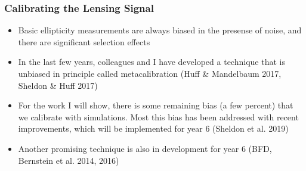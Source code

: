 \documentclass{beamer}
\begin{document}
\frame
{
    \frametitle{Calibrating the Lensing Signal}


    \begin{itemize}

        \item Basic ellipticity measurements are always biased in the
            presense of noise, and there are significant selection
            effects

        \item In the last few years, colleagues and I have developed a
            technique that is unbiased in principle called
            metacalibration (Huff \& Mandelbaum 2017, Sheldon \& Huff
            2017)

        \item For the work I will show, there is some remaining bias (a few
            percent) that we calibrate with simulations.  Most this bias has
            been addressed with recent improvements, which will be implemented
            for year 6 (Sheldon et al. 2019)

        \item Another promising technique is also in development for
            year 6 (BFD, Bernstein et al. 2014, 2016)

    \end{itemize}

}
\end{document}
